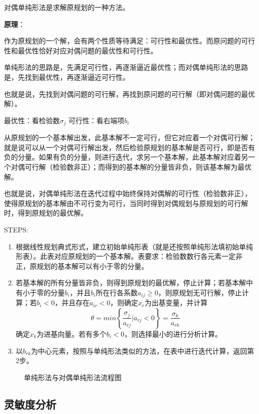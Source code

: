 \documentclass{book}
\begin{document}
对偶单纯形法是求解原规划的一种方法。

\textbf{原理}：

作为原规划的一个解，会有两个性质等待满足：可行性和最优性。而原问题的可行性和最优性恰好对应对偶问题的最优性和可行性。

单纯形法的思路是，先满足可行性，再逐渐逼近最优性；而对偶单纯形法的思路是，先找到最优性，再逐渐逼近可行性。

也就是说，先找到对偶问题的可行解，再找到原问题的可行解（即对偶问题的最优解）。

最优性：看检验数$\sigma_j$
可行性：看右端项$b_i$

从原规划的一个基本解出发，此基本解不一定可行，但它对应着一个对偶可行解；就是说可以从一个对偶可行解出发，然后检验原规划的基本解是否可行，即是否有负的分量。如果有负的分量，则进行迭代，求另一个基本解，此基本解对应着另一个对偶可行解（检验数非正）；而得到的基本解的分量皆非负，则该基本解为最优解。

也就是说，对偶单纯形法在迭代过程中始终保持对偶解的可行性（检验数非正），使得原规划的基本解由不可行变为可行，当同时得到对偶规划与原规划的可行解时，得到原规划的最优解。

STEPS:
\begin{enumerate}
    \item 根据线性规划典式形式，建立初始单纯形表（就是还按照单纯形法填初始单纯形表）。此表对应原规划的一个基本解。表要求：检验数数行各元素一定非正，原规划的基本解可以有小于零的分量。
    \item 若基本解的所有分量皆非负，则得到原规划的最优解，停止计算；若基本解中有小于零的分量$b_i$，并且$b_i$所在行各系数$a_{ij}\ge0$，则原规划无可行解，停止计算；若$b_i<0$，并且存在$a_{ir}<0$，则确定$x_r$为出基变量，并计算$$\theta=min\left\{\frac{\sigma_j}{a_{rj}}|a_{rj}<0\right\}=\frac{\sigma_k}{a_{rk}}$$确定$x_k$为进基向量。若有多个$b_i<0$，则选择最小的进行分析计算。
    \item 以$b_{rk}$为中心元素，按照与单纯形法类似的方法，在表中进行迭代计算，返回第2步。
\end{enumerate}

\begin{figure}[ht]
    \centering
    
    \caption{单纯形法与对偶单纯形法流程图}
    \label{con:DualSMFlow}
\end{figure}


\subsection{灵敏度分析}
\end{document}
